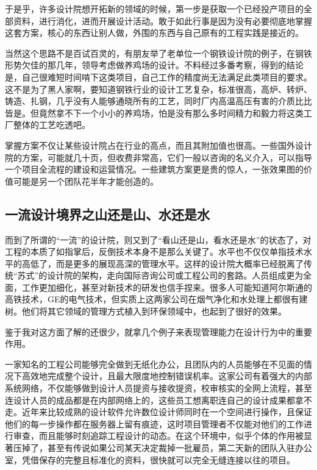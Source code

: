\documentclass[]{book}
\begin{document}
于是乎，许多设计院想开拓新的领域的时候，第一步是获取一个已经投产项目的全部资料，进行消化，进而开展设计活动。敢于如此行事是因为没有必要彻底地掌握这套方案，核心的东西让别人做，外围的东西与自己原有的工程实践是接近的。

当然这个思路不是百试百灵的，有朋友举了老单位一个钢铁设计院的例子，在钢铁形势欠佳的那几年，领导考虑做养鸡场的设计。不料经过多番考察，得到的结论是，自己很难短时间啃下这类项目，自己工作的精度尚无法满足此类项目的要求。这不是为了黑人家啊，要知道钢铁行业的设计工艺复杂，标准很高，高炉、转炉、铸造、扎钢，几乎没有人能够通晓所有的工艺，同时厂内高温高压有害的介质比比皆是。但竟然拿不下一个小小的养鸡场，怕是没有那么多时间精力和毅力将这类工厂整体的工艺吃透吧。

掌握方案不仅让某些设计院占在行业的高点，而且其附加值也很高。一些国外设计院的方案，可能就几十页，但收费非常高，它们一般以咨询的名义介入，可以指导一个项目全流程的建设和运营情况。一些建筑方案更是贵的惊人，一张效果图的价值可能是另一个团队花半年才能创造的。

\hypertarget{ux4e00ux6d41ux8bbeux8ba1ux5883ux754cux4e4bux5c71ux8fd8ux662fux5c71ux6c34ux8fd8ux662fux6c34}{%
\subsection{一流设计境界之山还是山、水还是水}\label{ux4e00ux6d41ux8bbeux8ba1ux5883ux754cux4e4bux5c71ux8fd8ux662fux5c71ux6c34ux8fd8ux662fux6c34}}

而到了所谓的``一流''的设计院，则又到了``看山还是山，看水还是水''的状态了，对工程的本质了如指掌后，反倒技术本身不是那么关键了。水平也不仅仅单指技术水平的高低了，而是更多的展现高深的管理水平。这样的设计院大概率已经脱离了传统``苏式''的设计院的架构，走向国际咨询公司或工程公司的套路。人员组成更为全面，工作更加细化，甚至对新技术的研发也信手捏来。很多人可能知道阿尔斯通的高铁技术，GE的电气技术，但实质上这两家公司在烟气净化和水处理上都很有建树。他们将其它领域的管理方式植入到环保领域中，也起到了很好的效果。

鉴于我对这方面了解的还很少，就拿几个例子来表现管理能力在设计行为中的重要作用。

一家知名的工程公司能够完全做到无纸化办公，且团队内的人员能够在不见面的情况下高效地完成整个设计，且最大限度地控制错误机率。这家公司有着强大的内部系统网络，不仅能够做到设计人员提资与接收提资，校审核实的全网上流程，甚至连设计人员的成品都是在内部网络上的，这些员工想离职连自己的设计成果都拿不走。近年来比较成熟的设计软件允许数位设计师同时在一个空间进行操作，且保证他们的每一步操作都在服务器上留有痕迹，这时项目管理者不仅能对他们的工作进行审查，而且能够时刻追踪工程设计的动态。在这个环境中，似乎个体的作用被显著压掉了，甚至有传说如果公司某天决定裁掉一批雇员，第二天新的团队入驻办公室，凭借保存的完整且标准化的资料，很快就可以完全无缝连接以往的项目。
\end{document}

